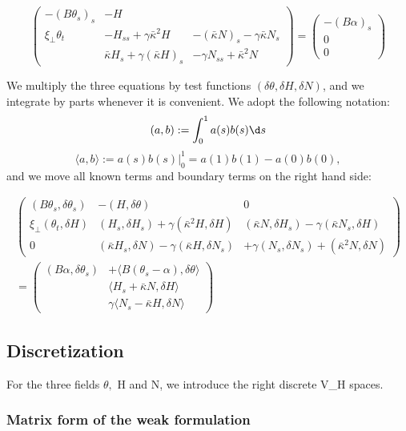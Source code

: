 \[\begin{pmatrix}
-(B\theta_s)_s & -H &  \\
\xi_\perp\theta_t & 
- H_{ss} + \gamma \bar \kappa^2H &
- (\bar\kappa N)_s - \gamma\bar\kappa N_s \\
 & 
\bar \kappa H_s +\gamma(\bar \kappa H)_s &
 - \gamma N_{ss} + \bar \kappa^2 N
\end{pmatrix}
%
=
\begin{pmatrix}
-(B\alpha)_s\\
0\\
0
\end{pmatrix}\]

We multiply the three equations by test functions
$(\delta \theta, \delta H, \delta N)$, and we integrate by parts
whenever it is convenient. We adopt the following notation:
\[
(a,b) := \int_0^1 a(s) b(s) \d s
\]
\[
\langle a,b \rangle := a(s) b(s) \big|^1_0 = a(1)b(1)-a(0)b(0),
\]
and we move all known terms and boundary terms on the right hand side:

\begin{multline}
\begin{pmatrix}
(B\theta_s, \delta \theta_s)  &  -(H,\delta\theta)  & 0 \\
\xi_\perp(\theta_t, \delta H) & 
(H_{s}, \delta H_s) 
+ \gamma (\bar \kappa^2 H, \delta H ) &
 (\bar\kappa N, \delta H_s) 
- \gamma(\bar\kappa N_s, \delta H) \\
0 & 
(\bar \kappa H_s, \delta N) 
-\gamma(\bar \kappa H, \delta N_s) &
%
%
+ \gamma(N_{s},\delta N_s) 
+ (\bar \kappa^2 N, \delta N)
\end{pmatrix}
%
\\
=
\begin{pmatrix}
(B\alpha, \delta \theta_s)& +\langle B(\theta_s-\alpha), \delta \theta\rangle\\
& \langle H_s+\bar\kappa N,\delta H\rangle
\\
&\gamma\langle N_{s}-\bar \kappa H, \delta N \rangle 
\end{pmatrix}
\end{multline}

\subsection{Discretization}

For the three fields $\theta,$ H and N, we introduce the right discrete V_H spaces.


\subsubsection{Matrix form of the weak
formulation}\label{matrix-form-of-the-weak-formulation}

